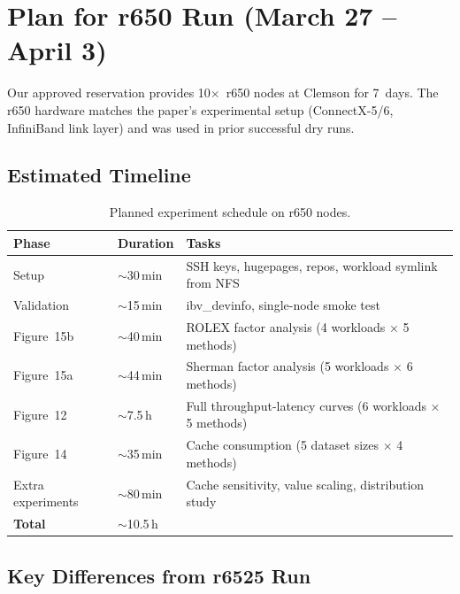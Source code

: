\documentclass[11pt,a4paper]{article}
\begin{document}
\section{Plan for r650 Run (March 27 -- April 3)}
\label{sec:plan}

Our approved reservation provides 10$\times$~r650 nodes at Clemson for 7~days. The r650 hardware matches the paper's experimental setup (ConnectX-5/6, InfiniBand link layer) and was used in prior successful dry runs.

\subsection{Estimated Timeline}

\begin{table}[H]
\centering
\caption{Planned experiment schedule on r650 nodes.}
\label{tab:schedule}
\begin{tabular}{@{}lll@{}}
\toprule
\textbf{Phase} & \textbf{Duration} & \textbf{Tasks} \\
\midrule
Setup & $\sim$30\,min & SSH keys, hugepages, repos, workload symlink from NFS \\
Validation & $\sim$15\,min & ibv\_devinfo, single-node smoke test \\
Figure~15b & $\sim$40\,min & ROLEX factor analysis (4 workloads $\times$ 5 methods) \\
Figure~15a & $\sim$44\,min & Sherman factor analysis (5 workloads $\times$ 6 methods) \\
Figure~12 & $\sim$7.5\,h & Full throughput-latency curves (6 workloads $\times$ 5 methods) \\
Figure~14 & $\sim$35\,min & Cache consumption (5 dataset sizes $\times$ 4 methods) \\
Extra experiments & $\sim$80\,min & Cache sensitivity, value scaling, distribution study \\
\midrule
\textbf{Total} & $\sim$10.5\,h & \\
\bottomrule
\end{tabular}
\end{table}

\subsection{Key Differences from r6525 Run}
\end{document}
